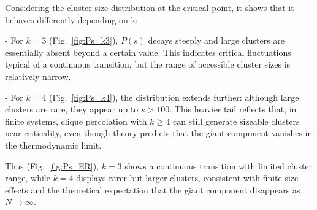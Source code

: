 \noindent  Considering the cluster size distribution at the critical point, it shows that it behaves differently depending on k:

- For $k=3$ (Fig.~\ref{fig:Ps_k3}), $P(s)$ decays steeply and large clusters 
  are essentially absent beyond a certain value. 
  This indicates critical fluctuations typical of a continuous transition, 
  but the range of accessible cluster sizes is relatively narrow.  

- For $k=4$ (Fig.~\ref{fig:Ps_k4}), the distribution extends further: 
  although large clusters are rare, they appear up to $s > 100$. 
  This heavier tail reflects that, in finite systems, clique percolation 
  with $k \geq 4$ can still generate sizeable clusters near criticality, 
  even though theory predicts that the giant component vanishes in the 
  thermodynamic limit.  

\noindent  Thus (Fig.~\ref{fig:Ps_ER}), $k=3$ shows a continuous transition with limited 
cluster range, while $k=4$ displays rarer but larger clusters, consistent 
with finite-size effects and the theoretical expectation that the giant 
component disappears as $N \to \infty$.

